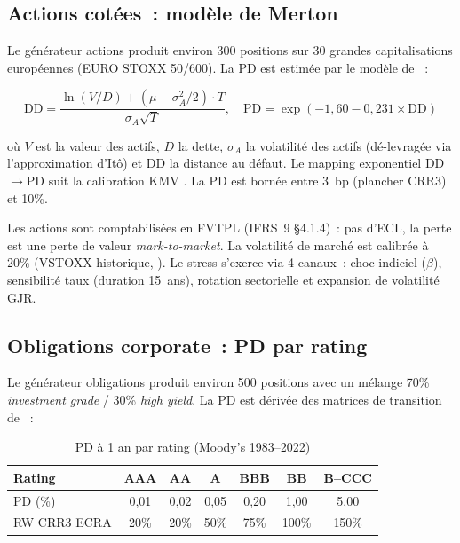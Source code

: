 \documentclass[12pt, a4paper, twoside, openright]{report}
\theoremstyle{definition}
\begin{document}
\subsection{Actions cotées~: modèle de Merton}

Le générateur actions produit environ 300 positions sur 30 grandes capitalisations européennes (EURO STOXX 50/600). La PD est estimée par le modèle de \citet{merton1974}~:

\begin{equation}
\text{DD} = \frac{\ln(V/D) + (\mu - \sigma_A^2/2) \cdot T}{\sigma_A \sqrt{T}}, \quad
\text{PD} = \exp(-1{,}60 - 0{,}231 \times \text{DD})
\label{eq:merton-dd}
\end{equation}

\noindent où $V$ est la valeur des actifs, $D$ la dette, $\sigma_A$ la volatilité des actifs (dé-levragée via l'approximation d'Itô) et DD la distance au défaut. Le mapping exponentiel DD$\to$PD suit la calibration KMV \citep{crosbie2003}. La PD est bornée entre 3~bp (plancher CRR3) et 10\%.

Les actions sont comptabilisées en FVTPL (IFRS~9 §4.1.4)~: pas d'ECL, la perte est une perte de valeur \textit{mark-to-market}. La volatilité de marché est calibrée à 20\% (VSTOXX historique, \citealt{bekaert2014}). Le stress s'exerce via 4 canaux~: choc indiciel ($\beta$), sensibilité taux (duration 15~ans), rotation sectorielle et expansion de volatilité GJR.

\subsection{Obligations corporate~: PD par rating}

Le générateur obligations produit environ 500 positions avec un mélange 70\% \textit{investment grade} / 30\% \textit{high yield}. La PD est dérivée des matrices de transition de \citet{moody2023}~:

\begin{table}[htbp]
\centering
\caption{PD à 1 an par rating (Moody's 1983--2022)}
\label{tab:rating-pd}
\begin{tabular}{lcccccc}
\toprule
\textbf{Rating} & AAA & AA & A & BBB & BB & B--CCC \\
\midrule
PD (\%) & 0,01 & 0,02 & 0,05 & 0,20 & 1,00 & 5,00 \\
RW CRR3 ECRA & 20\% & 20\% & 50\% & 75\% & 100\% & 150\% \\
\bottomrule
\end{tabular}
\end{table}
\end{document}
